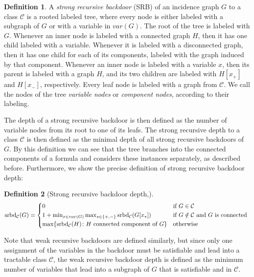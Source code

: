 \documentclass[11pt,a4paper]{article}
\theoremstyle{definition}
\newtheorem{definition}{Definition}[section]
\theoremstyle{proposition}
\begin{document}
\begin{definition}
A \textit{strong recursive backdoor} (SRB) of an incidence graph $G$ to a class $\mathcal{C}$ is a rooted labeled tree, where every node is either labeled with a subgraph of $G$ or with a variable in $var(G)$. The root of the tree is labeled with $G$. Whenever an inner node is labeled with a connected graph $H$, then it has one child labeled with a variable. Whenever it is labeled with a disconnected graph, then it has one child for each of its components, labeled with the graph induced by that component. Whenever an inner node is labeled with a variable $x$, then its parent is labeled with a graph $H$, and its two children are labeled with $H[x_+]$ and $H[x_-]$, respectively. Every leaf node is labeled with a graph from $\mathcal{C}$. We call the nodes of the tree \textit{variable nodes} or \textit{component nodes}, according to their labeling. 
\end{definition}
The depth of a strong recursive backdoor is then defined as the number of variable nodes from its root to one of its leafs. The strong recursive depth to a class $\mathcal{C}$ is then defined as the minimal depth of all strong recursive backdoors of $G$. By this definition we can see that the tree branches into the connected components of a formula and considers these instances separately, as described before. Furthermore, we show the precise definition of strong recursive backdoor depth:
\begin{definition}[Strong recursive backdoor depth,{\cite[Definition 3.1, p.5]{maehlmann2021recursive}}]

\begin{equation*}
    \text{srbd}_{\mathcal{C}}(G) = 
    \begin{cases*}
      0 & if $G \in \mathcal{C}$  \\
	1 + \min_{x \in var(G)} \max_{\star \in \{+,-\}} \text{srbd}_{\mathcal{C}}(G[x_{\star}]) & if $G \notin \mathcal{C}$ and $G$ is connected \\
      \max \{  \text{srbd}_{\mathcal{C}}(H) \colon H \text{ connected component of } G \}       & otherwise 
    \end{cases*}
  \end{equation*}
\end{definition}
Note that weak recursive backdoors are defined similarly, but since only one assignment of the variables in the backdoor must be satisfiable and lead into a tractable class $\mathcal{C}$, the weak recursive backdoor depth is defined as the minimum number of variables that lead into a subgraph of $G$ that is satisfiable and in $\mathcal{C}$.
\end{document}
